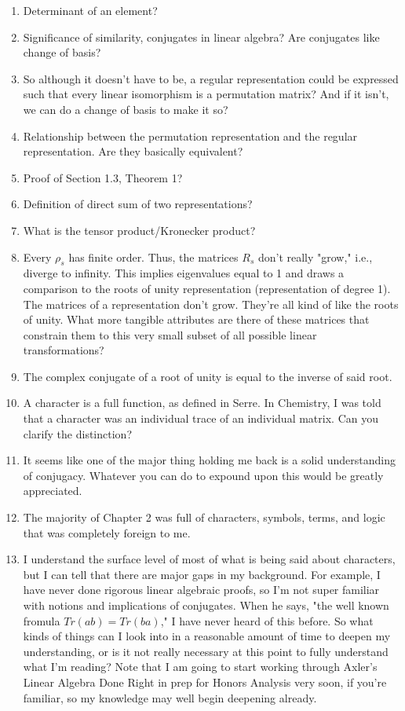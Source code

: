 \documentclass[../notes.tex]{subfiles}
\begin{document}
\begin{enumerate}
    \item Determinant of an element?
    \item Significance of similarity, conjugates in linear algebra? Are conjugates like change of basis?
    \item So although it doesn't have to be, a regular representation could be expressed such that every linear isomorphism is a permutation matrix? And if it isn't, we can do a change of basis to make it so?
    \item Relationship between the permutation representation and the regular representation. Are they basically equivalent?
    \item Proof of Section 1.3, Theorem 1?
    \item Definition of direct sum of two representations?
    \item What is the tensor product/Kronecker product?
    \item Every $\rho_s$ has finite order. Thus, the matrices $R_s$ don't really "grow," i.e., diverge to infinity. This implies eigenvalues equal to 1 and draws a comparison to the roots of unity representation (representation of degree 1). The matrices of a representation don't grow. They're all kind of like the roots of unity. What more tangible attributes are there of these matrices that constrain them to this very small subset of all possible linear transformations?
    \item The complex conjugate of a root of unity is equal to the inverse of said root.
    \item A character is a full function, as defined in Serre. In Chemistry, I was told that a character was an individual trace of an individual matrix. Can you clarify the distinction?
    \item It seems like one of the major thing holding me back is a solid understanding of conjugacy. Whatever you can do to expound upon this would be greatly appreciated.
    \item The majority of Chapter 2 was full of characters, symbols, terms, and logic that was completely foreign to me.
    \item I understand the surface level of most of what is being said about characters, but I can tell that there are major gaps in my background. For example, I have never done rigorous linear algebraic proofs, so I'm not super familiar with notions and implications of conjugates. When he says, "the well known fromula $Tr(ab)=Tr(ba)$," I have never heard of this before. So what kinds of things can I look into in a reasonable amount of time to deepen my understanding, or is it not really necessary at this point to fully understand what I'm reading? Note that I am going to start working through Axler's Linear Algebra Done Right in prep for Honors Analysis very soon, if you're familiar, so my knowledge may well begin deepening already.
\end{enumerate}
\end{document}
